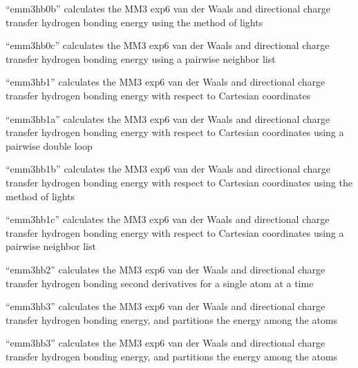\documentclass[letterpaper,11pt,english]{sphinxmanual}
\begin{document}

“emm3hb0b” calculates the MM3 exp\sphinxhyphen{}6 van der Waals and
directional charge transfer hydrogen bonding energy using
the method of lights


“emm3hb0c” calculates the MM3 exp\sphinxhyphen{}6 van der Waals and
directional charge transfer hydrogen bonding energy using
a pairwise neighbor list


“emm3hb1” calculates the MM3 exp\sphinxhyphen{}6 van der Waals and directional
charge transfer hydrogen bonding energy with respect to Cartesian
coordinates


“emm3hb1a” calculates the MM3 exp\sphinxhyphen{}6 van der Waals and directional
charge transfer hydrogen bonding energy with respect to Cartesian
coordinates using a pairwise double loop


“emm3hb1b” calculates the MM3 exp\sphinxhyphen{}6 van der Waals and directional
charge transfer hydrogen bonding energy with respect to Cartesian
coordinates using the method of lights


“emm3hb1c” calculates the MM3 exp\sphinxhyphen{}6 van der Waals and directional
charge transfer hydrogen bonding energy with respect to Cartesian
coordinates using a pairwise neighbor list


“emm3hb2” calculates the MM3 exp\sphinxhyphen{}6 van der Waals and directional
charge transfer hydrogen bonding second derivatives for a single
atom at a time


“emm3hb3” calculates the MM3 exp\sphinxhyphen{}6 van der Waals and directional
charge transfer hydrogen bonding energy, and partitions the energy
among the atoms


“emm3hb3” calculates the MM3 exp\sphinxhyphen{}6 van der Waals and
directional charge transfer hydrogen bonding energy, and
partitions the energy among the atoms

\end{document}
